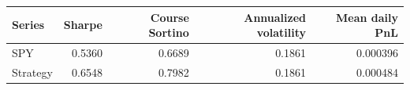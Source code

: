 \begin{tabular}{lrrrr}
\toprule
Series & Sharpe & Course Sortino & Annualized volatility & Mean daily PnL \\
\midrule
SPY & 0.5360 & 0.6689 & 0.1861 & 0.000396 \\
Strategy & 0.6548 & 0.7982 & 0.1861 & 0.000484 \\
\bottomrule
\end{tabular}
